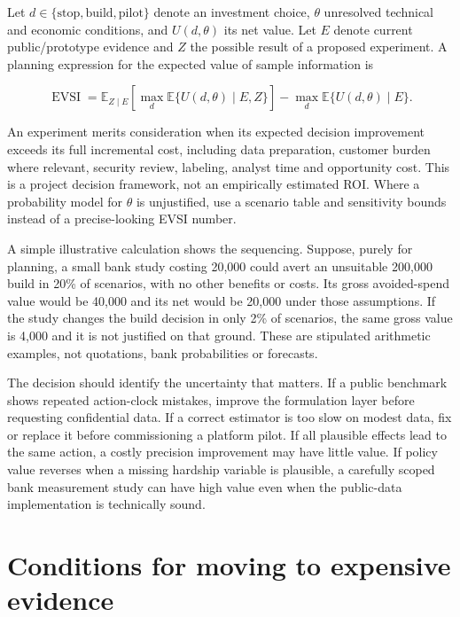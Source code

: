 Let \(d\in\{\text{stop},\text{build},\text{pilot}\}\) denote an
investment choice, \(\theta\) unresolved technical and economic
conditions, and \(U(d,\theta)\) its net value. Let \(E\) denote current
public/prototype evidence and \(Z\) the possible result of a proposed
experiment. A planning expression for the expected value of sample
information is

\[
\operatorname{EVSI}
=\mathbb E_{Z\mid E}\!\left[\max_d\mathbb E\{U(d,\theta)\mid E,Z\}\right]
-\max_d\mathbb E\{U(d,\theta)\mid E\}.
\]

An experiment merits consideration when its expected decision
improvement exceeds its full incremental cost, including data
preparation, customer burden where relevant, security review, labeling,
analyst time and opportunity cost. This is a project decision framework,
not an empirically estimated ROI. Where a probability model for
\(\theta\) is unjustified, use a scenario table and sensitivity bounds
instead of a precise-looking EVSI number.

A simple illustrative calculation shows the sequencing. Suppose, purely
for planning, a small bank study costing 20,000 could avert an
unsuitable 200,000 build in 20\% of scenarios, with no other benefits or
costs. Its gross avoided-spend value would be 40,000 and its net would
be 20,000 under those assumptions. If the study changes the build
decision in only 2\% of scenarios, the same gross value is 4,000 and it
is not justified on that ground. These are stipulated arithmetic
examples, not quotations, bank probabilities or forecasts.

The decision should identify the uncertainty that matters. If a public
benchmark shows repeated action-clock mistakes, improve the formulation
layer before requesting confidential data. If a correct estimator is too
slow on modest data, fix or replace it before commissioning a platform
pilot. If all plausible effects lead to the same action, a costly
precision improvement may have little value. If policy value reverses
when a missing hardship variable is plausible, a carefully scoped bank
measurement study can have high value even when the public-data
implementation is technically sound.

\hypertarget{conditions-for-moving-to-expensive-evidence}{%
\section{Conditions for moving to expensive
evidence}\label{conditions-for-moving-to-expensive-evidence}}


